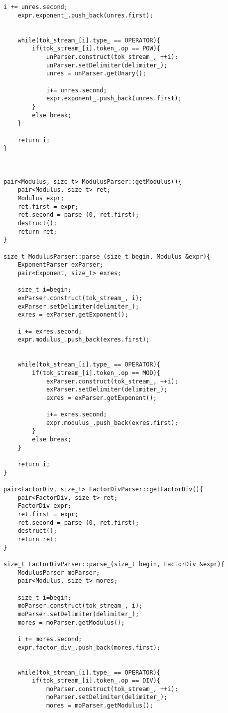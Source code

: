 \documentclass[pdftex,12pt,letterpaper,notitlepage,twoside]{article}
\begin{document}
\begin{lstlisting}[frame=single,caption={C program for testing}]
    i += unres.second;
    expr.exponent_.push_back(unres.first);
    

    while(tok_stream_[i].type_ == OPERATOR){
        if(tok_stream_[i].token_.op == POW){
            unParser.construct(tok_stream_, ++i);
            unParser.setDelimiter(delimiter_);
            unres = unParser.getUnary();
            
            i+= unres.second;
            expr.exponent_.push_back(unres.first);
        }
        else break;
    }

    return i;
}



pair<Modulus, size_t> ModulusParser::getModulus(){
    pair<Modulus, size_t> ret;
    Modulus expr;
    ret.first = expr;
    ret.second = parse_(0, ret.first);
    destruct();
    return ret;
}

size_t ModulusParser::parse_(size_t begin, Modulus &expr){
    ExponentParser exParser;
    pair<Exponent, size_t> exres;

    size_t i=begin;
    exParser.construct(tok_stream_, i);
    exParser.setDelimiter(delimiter_);
    exres = exParser.getExponent();

    i += exres.second;
    expr.modulus_.push_back(exres.first);
    

    while(tok_stream_[i].type_ == OPERATOR){
        if(tok_stream_[i].token_.op == MOD){
            exParser.construct(tok_stream_, ++i);
            exParser.setDelimiter(delimiter_);
            exres = exParser.getExponent();
            
            i+= exres.second;
            expr.modulus_.push_back(exres.first);
        }
        else break;
    }

    return i;
}

pair<FactorDiv, size_t> FactorDivParser::getFactorDiv(){
    pair<FactorDiv, size_t> ret;
    FactorDiv expr;
    ret.first = expr;
    ret.second = parse_(0, ret.first);
    destruct();
    return ret;
}

size_t FactorDivParser::parse_(size_t begin, FactorDiv &expr){
    ModulusParser moParser;
    pair<Modulus, size_t> mores;

    size_t i=begin;
    moParser.construct(tok_stream_, i);
    moParser.setDelimiter(delimiter_);
    mores = moParser.getModulus();

    i += mores.second;
    expr.factor_div_.push_back(mores.first);
    

    while(tok_stream_[i].type_ == OPERATOR){
        if(tok_stream_[i].token_.op == DIV){
            moParser.construct(tok_stream_, ++i);
            moParser.setDelimiter(delimiter_);
            mores = moParser.getModulus();
            

\end{lstlisting}
\end{document}
